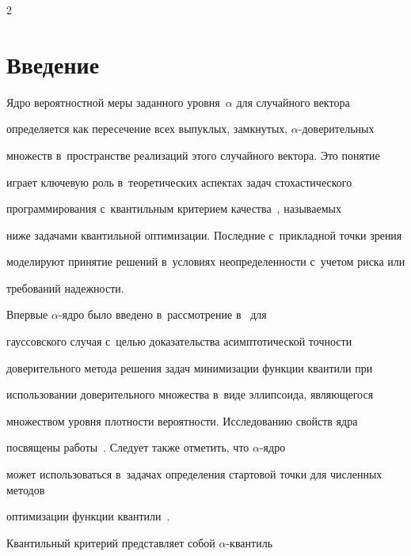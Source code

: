 \begin{multicols}{2}



\label{st\stat}





\section{Введение} 



Ядро вероятностной меры заданного уровня~$\alpha$ для случайного вектора

 определяется как пересечение всех вы\-пук\-лых, замк\-ну\-тых, $\alpha$-до\-ве\-ри\-тель\-ных 

 множеств в~про\-стран\-ст\-ве реализаций этого случайного вектора. Это понятие 

 играет клю\-че\-вую роль в~тео\-ре\-ти\-че\-ских аспектах задач сто\-ха\-сти\-че\-ско\-го 

 программирования с~квантильным критерием качества~\cite{kankibzun}, называемых 

 ниже задачами квантильной оптимизации. Последние с~прикладной точки зрения 

 моделируют принятие решений в~условиях не\-опре\-де\-лен\-ности с~учетом риска или 

 требований   на\-деж\-ности.



Впервые $\alpha$-яд\-ро было введено в~рассмотрение в~\cite{malkib} для 

гауссовского случая с~целью доказательства асимптотической точ\-ности 

доверительного метода решения задач минимизации функции квантили при 

использовании доверительного множества в~виде эл\-лип\-со\-ида, яв\-ля\-юще\-го\-ся 

множеством уровня плот\-ности вероятности. Исследованию свойств ядра 

посвящены работы~\cite{kanrus, kansur}. Следует также отметить, что $\alpha$-яд\-ро 

может использоваться в~задачах опре\-де\-ле\-ния стар\-то\-вой точ\-ки для чис\-лен\-ных методов 

оптимизации функ\-ции квантили~\cite{kibkurb, kibkurben}.



Квантильный критерий пред\-став\-ля\-ет собой \mbox{$\alpha$-кван}\-тиль 


\end{multicols}
